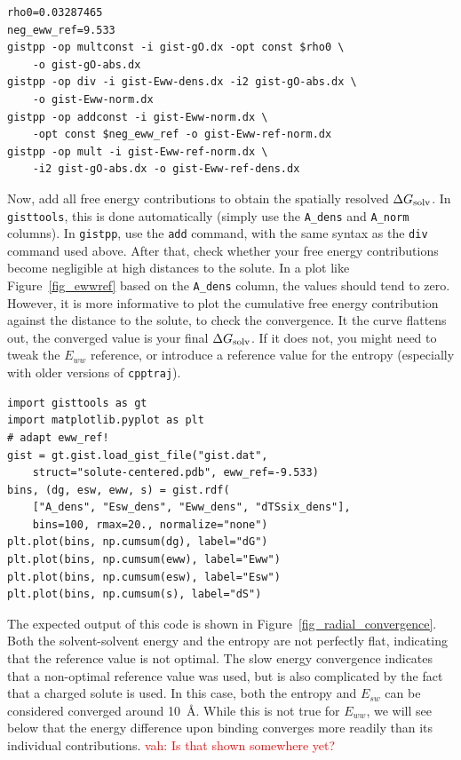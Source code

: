 \documentclass[9pt,tutorial]{livecoms}
\newcommand{\dgsolv}{\Delta G_\textup{solv}}
\newcommand{\software}{\texttt}
\newcommand{\todo}{\textcolor{red}}
\newcommand\inlinecode{\texttt}
\begin{document}
\begin{lstlisting}
rho0=0.03287465
neg_eww_ref=9.533
gistpp -op multconst -i gist-gO.dx -opt const $rho0 \
    -o gist-gO-abs.dx 
gistpp -op div -i gist-Eww-dens.dx -i2 gist-gO-abs.dx \
    -o gist-Eww-norm.dx
gistpp -op addconst -i gist-Eww-norm.dx \
    -opt const $neg_eww_ref -o gist-Eww-ref-norm.dx
gistpp -op mult -i gist-Eww-ref-norm.dx \
    -i2 gist-gO-abs.dx -o gist-Eww-ref-dens.dx
\end{lstlisting}

Now, add all free energy contributions to obtain the spatially resolved $\dgsolv$.
In \software{gisttools}, this is done automatically (simply use the \inlinecode{A\_dens} and \inlinecode{A\_norm} columns).
In \software{gistpp}, use the \inlinecode{add} command, with the same syntax as the \inlinecode{div} command used above.
After that, check whether your free energy contributions become negligible at high distances to the solute.
In a plot like Figure~\ref{fig_ewwref} based on the \inlinecode{A\_dens} column, the values should tend to zero.
However, it is more informative to plot the cumulative free energy contribution against the distance to the solute, to check the convergence.
It the curve flattens out, the converged value is your final $\dgsolv$\@.
If it does not, you might need to tweak the $E_{ww}$ reference, or introduce a reference value for the entropy (especially with older versions of \software{cpptraj}).

\begin{lstlisting}[style=python]
import gisttools as gt
import matplotlib.pyplot as plt
# adapt eww_ref!
gist = gt.gist.load_gist_file("gist.dat",
    struct="solute-centered.pdb", eww_ref=-9.533)
bins, (dg, esw, eww, s) = gist.rdf(
    ["A_dens", "Esw_dens", "Eww_dens", "dTSsix_dens"],
    bins=100, rmax=20., normalize="none")
plt.plot(bins, np.cumsum(dg), label="dG")
plt.plot(bins, np.cumsum(eww), label="Eww")
plt.plot(bins, np.cumsum(esw), label="Esw")
plt.plot(bins, np.cumsum(s), label="dS")
\end{lstlisting}

The expected output of this code is shown in Figure~\ref{fig_radial_convergence}.
Both the solvent-solvent energy and the entropy are not perfectly flat, indicating that the reference value is not optimal.
The slow energy convergence indicates that a non-optimal reference value was used, but is also complicated by the fact that a charged solute is used.
In this case, both the entropy and $E_{sw}$ can be considered converged around \SI{10}{\angstrom}.
While this is not true for $E_{ww}$, we will see below that the energy difference upon binding converges more readily than its individual contributions.
\todo{vah: Is that shown somewhere yet?}
\end{document}
